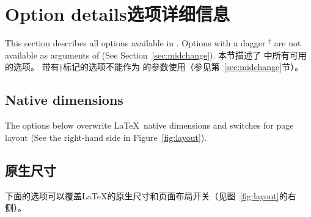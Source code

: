 \section{Option details\hfill 选项详细信息}
\begin{paracol}{2}
This section describes all options available in \Gm.
Options with a dagger $^\dagger$ are not available 
as arguments of  (See Section~\ref{sec:midchange}).
\switchcolumn
本节描述了 \Gm 中所有可用的选项。
带有†标记的选项不能作为  的参数使用（参见第~\ref{sec:midchange}节）。
\end{paracol}

% 
% 
% 
% 
 

\begin{paracol}{2}
\subsection{Native dimensions}\label{sec:dimension}

The options below overwrite \LaTeX\ native dimensions and switches for page
layout (See the right-hand side in Figure~\ref{fig:layout}).
\switchcolumn
\subsection{原生尺寸}
下面的选项可以覆盖\LaTeX 的原生尺寸和页面布局开关（见图~\ref{fig:layout}的右侧）。
\end{paracol}

